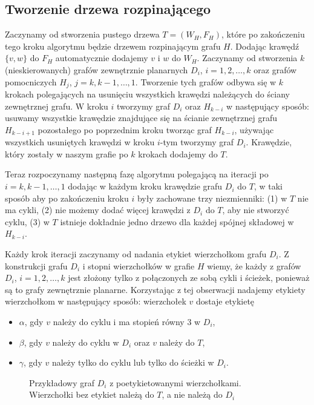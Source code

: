 \documentclass[twoside,a4paper,12pt]{report} %
\theoremstyle{break}
\begin{document}
\subsection{Tworzenie drzewa rozpinającego}
Zaczynamy od stworzenia pustego drzewa $T=(W_H, F_H)$, które po zakończeniu tego kroku algorytmu będzie drzewem rozpinającym grafu $H$. Dodając krawędź $\{v,w\}$ do $F_H$ automatycznie dodajemy $v$ i $w$ do $W_H$. Zaczynamy od stworzenia $k$ (nieskierowanych) grafów zewnętrznie planarnych $D_i$, $i=1,2,\dots,k$ oraz grafów pomocniczych $H_{j}$, $j=k,k-1,\dots,1$. Tworzenie tych grafów odbywa się w $k$ krokach polegających na usunięciu wszystkich krawędzi należących do ściany zewnętrznej grafu. W kroku $i$ tworzymy graf $D_i$ oraz $H_{k-i}$ w następujący sposób: usuwamy wszystkie krawędzie znajdujące się na ścianie zewnętrznej grafu $H_{k-i+1}$ pozostałego po poprzednim kroku tworząc graf $H_{k-i}$, używając wszystkich usuniętych krawędzi w kroku $i$-tym tworzymy graf $D_i$. Krawędzie, który zostały w naszym grafie po $k$ krokach dodajemy do $T$.

Teraz rozpoczynamy następną fazę algorytmu polegającą na iteracji po $i=k,k-1,\dots,1$ dodając w każdym kroku krawędzie grafu $D_i$ do $T$, w taki sposób aby po zakończeniu kroku $i$ były zachowane trzy niezmienniki: (1) w $T$ nie ma cykli, (2) nie możemy dodać więcej krawędzi z $D_i$ do $T$, aby nie stworzyć cyklu, (3) w $T$ istnieje dokładnie jedno drzewo dla każdej spójnej składowej w $H_{k-i}$.

Każdy krok iteracji zaczynamy od nadania etykiet wierzchołkom grafu $D_i$. Z konstrukcji grafu $D_i$ i stopni wierzchołków w grafie $H$ wiemy, że każdy z grafów $D_i$, $i=1,2,\dots, k$ jest złożony tylko z połączonych ze sobą cykli i ścieżek, ponieważ są to grafy zewnętrznie planarne. Korzystając z tej obserwacji nadajemy etykiety wierzchołkom w następujący sposób: wierzchołek $v$ dostaje etykietę
\begin{itemize}
    \item $\alpha$, gdy $v$ należy do cyklu i ma stopień równy $3$ w $D_i$,
    \item $\beta$, gdy $v$ należy do cyklu w $D_i$ oraz $v$ należy do $T$,
    \item $\gamma$, gdy $v$ należy tylko do cyklu lub tylko do ścieżki w $D_i$.
\end{itemize}

\begin{figure}[ht]
    \centering
    
    \caption{Przykładowy graf $D_i$ z poetykietowanymi wierzchołkami. Wierzchołki bez etykiet należą do $T$, a nie należą do $D_i$}
    \label{spanning}
\end{figure}
\end{document}
